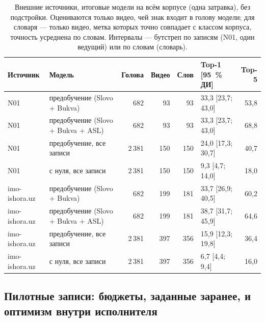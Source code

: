 \documentclass[a4paper,fleqn]{cas-dc}
\begin{document}
\begin{table}[t]
\caption{Внешние источники, итоговые модели на всём корпусе (одна затравка), без подстройки. Оцениваются только видео, чей знак входит в голову модели; для словаря — только видео, метка которых точно совпадает с классом корпуса, точность усреднена по словам. Интервалы — бутстреп по записям (N01, один ведущий) или по словам (словарь).}\label{tab:external}
\footnotesize
\centering
\begin{tabular}{llrrrlr}
\toprule
\textbf{Источник} & \textbf{Модель} & \textbf{Голова} & \textbf{Видео} & \textbf{Слов} & \textbf{Top-1 [95~\% ДИ]} & \textbf{Top-5} \\
\midrule
N01 & предобучение (Slovo + Bukva) & 682 & 93 & 93 & 33,3 [23,7; 43,0] & 53,8 \\
N01 & предобучение (Slovo + Bukva + ASL) & 682 & 93 & 93 & 33,3 [23,7; 43,0] & 68,8 \\
N01 & предобучение, все записи & 2\,381 & 150 & 150 & 24,0 [17,3; 30,7] & 40,7 \\
N01 & с нуля, все записи & 2\,381 & 150 & 150 & 9,3 [4,7; 14,0] & 18,0 \\
imo-ishora.uz & предобучение (Slovo + Bukva) & 682 & 199 & 181 & 33,7 [26,9; 40,5] & 60,2 \\
imo-ishora.uz & предобучение (Slovo + Bukva + ASL) & 682 & 199 & 181 & 38,7 [31,7; 45,9] & 64,6 \\
imo-ishora.uz & предобучение, все записи & 2\,381 & 397 & 356 & 15,9 [12,3; 19,8] & 36,4 \\
imo-ishora.uz & с нуля, все записи & 2\,381 & 397 & 356 & 6,7 [4,4; 9,4] & 16,0 \\
\bottomrule
\end{tabular}
\end{table}

\hypertarget{ux43fux438ux43bux43eux442ux43dux44bux435-ux437ux430ux43fux438ux441ux438-ux431ux44eux434ux436ux435ux442ux44b-ux437ux430ux434ux430ux43dux43dux44bux435-ux437ux430ux440ux430ux43dux435ux435-ux438-ux43eux43fux442ux438ux43cux438ux437ux43c-ux432ux43dux443ux442ux440ux438-ux438ux441ux43fux43eux43bux43dux438ux442ux435ux43bux44f}{%
\subsection{Пилотные записи: бюджеты, заданные заранее, и оптимизм внутри исполнителя}\label{ux43fux438ux43bux43eux442ux43dux44bux435-ux437ux430ux43fux438ux441ux438-ux431ux44eux434ux436ux435ux442ux44b-ux437ux430ux434ux430ux43dux43dux44bux435-ux437ux430ux440ux430ux43dux435ux435-ux438-ux43eux43fux442ux438ux43cux438ux437ux43c-ux432ux43dux443ux442ux440ux438-ux438ux441ux43fux43eux43bux43dux438ux442ux435ux43bux44f}}
\end{document}
